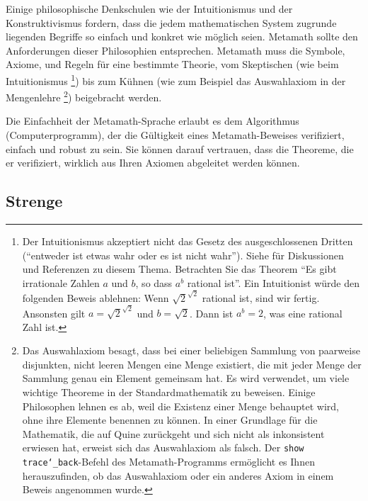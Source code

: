Einige philosophische Denkschulen wie der Intuitionismus und der Konstruktivismus fordern, dass die jedem mathematischen System zugrunde liegenden Begriffe so einfach und konkret wie möglich seien.  Metamath sollte den Anforderungen dieser Philosophien entsprechen.  Metamath muss die Symbole, Axiome, und Regeln für eine bestimmte Theorie, vom Skeptischen (wie beim Intuitionismus
\footnote{Der Intuitionismus akzeptiert nicht das Gesetz des ausgeschlossenen Dritten ("`entweder ist etwas wahr oder es ist nicht wahr"').  Siehe \cite[S.~xi]{Tymoczko} für Diskussionen und Referenzen zu diesem Thema.  Betrachten Sie das Theorem "`Es gibt irrationale Zahlen $a$ und $b$, so dass $a^b$ rational ist"'.  Ein Intuitionist würde den folgenden Beweis ablehnen:  Wenn $\sqrt{2}^{\sqrt{2}}$ rational ist, sind wir fertig.  Ansonsten gilt $a=\sqrt{2}^{\sqrt{2}}$ und $b=\sqrt{2}$. Dann ist $a^b=2$, was eine rational Zahl ist.})
bis zum Kühnen (wie zum Beispiel das Auswahlaxiom in der Mengenlehre
\footnote{Das Auswahlaxiom besagt, dass bei einer beliebigen Sammlung von paarweise disjunkten, nicht leeren Mengen eine Menge existiert, die mit jeder Menge der Sammlung genau ein Element gemeinsam hat.  Es wird verwendet, um viele wichtige Theoreme in der Standardmathematik zu beweisen.  Einige Philosophen lehnen es ab, weil die Existenz einer Menge behauptet wird, ohne ihre Elemente benennen zu können\cite[S.~154]{Enderton}.  In einer Grundlage für die Mathematik, die auf Quine zurückgeht und sich nicht als inkonsistent erwiesen hat, erweist sich das Auswahlaxiom als falsch\cite[S.~23]{Curry}.  Der \texttt{show trace{\char`\_}back}-Befehl des Metamath-Programms ermöglicht es Ihnen herauszufinden, ob das Auswahlaxiom oder ein anderes Axiom in einem Beweis angenommen wurde.}) beigebracht werden.

Die Einfachheit der Metamath-Sprache erlaubt es dem Algorithmus (Computerprogramm),
der die Gültigkeit eines Metamath-Beweises verifiziert, einfach und
robust zu sein.  Sie können darauf vertrauen, dass die Theoreme, die er verifiziert, wirklich aus Ihren Axiomen abgeleitet werden können.

\subsection{Strenge}

